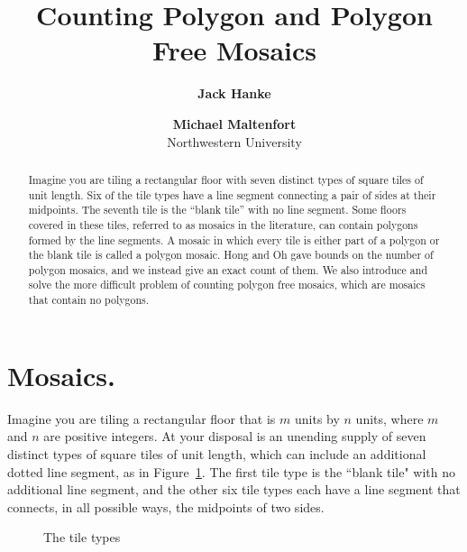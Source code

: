 \documentclass[12pt]{article}
\date{}
\author{
    \textbf{Jack Hanke}\\
    \and
    \textbf{Michael Maltenfort}\\
    Northwestern University
    }
\title{\textbf{Counting Polygon and Polygon Free Mosaics}}
\theoremstyle{plain}
\theoremstyle{remark}
\theoremstyle{definition}
\theoremstyle{remark}
\theoremstyle{definition}
\newcommand{\cell}[4]{ \draw[thick] ( #1 , #2 ) rectangle ( #3 , #4 );}
\newcommand{\cellA}[4]{ \draw[thick] ( #1 , #2 ) rectangle ( #3 , #4 ); \draw[red, thick, densely dotted] (#3 * 0.5 + #1 * 0.5 , #2) -- (#1, #4 * 0.5 + #2 * 0.5);}
\newcommand{\cellB}[4]{ \draw[thick] ( #1 , #2 ) rectangle ( #3 , #4 ); \draw[red, thick, densely dotted] (#3 * 0.5 + #1 * 0.5 , #2) -- (#3, #4 * 0.5 + #2 * 0.5);}
\newcommand{\cellC}[4]{ \draw[thick] ( #1 , #2 ) rectangle ( #3 , #4 ); \draw[red, thick, densely dotted] (#3 * 0.5 + #1 * 0.5 , #4) -- (#3, #4 * 0.5 + #2 * 0.5);}
\newcommand{\cellD}[4]{ \draw[thick] ( #1 , #2 ) rectangle ( #3 , #4 ); \draw[red, thick, densely dotted] (#3 * 0.5 + #1 * 0.5 , #4) -- (#1, #4 * 0.5 + #2 * 0.5);}
\newcommand{\cellE}[4]{ \draw[thick] ( #1 , #2 ) rectangle ( #3 , #4 ); \draw[red, thick, densely dotted] (#3, #4 * 0.5 + #2 * 0.5) -- (#1, #4 * 0.5 + #2 * 0.5);}
\newcommand{\cellF}[4]{ \draw[thick] ( #1 , #2 ) rectangle ( #3 , #4 ); \draw[red, thick, densely dotted] (#3 * 0.5 + #1 * 0.5 , #2) -- (#3 * 0.5 + #1 * 0.5 , #4);}
\newcommand{\lablnode}[3]{\node[shape=circle,draw=none,fill=none, inner sep=0pt,minimum size=0pt] (A) at ( #1 , #2 ) {#3};}
\begin{document}
\maketitle

\begin{center}

\begin{abstract}
Imagine you are tiling a rectangular floor with seven distinct types of square tiles of unit length. Six of the tile types have a line segment connecting a pair of sides at their midpoints. The seventh tile is the ``blank tile'' with no line segment. Some floors covered in these tiles, referred to as mosaics in the literature, can contain polygons formed by the line segments. A mosaic in which every tile is either part of a polygon or the blank tile is called a polygon mosaic.  Hong and Oh gave bounds on the number of polygon mosaics, and we instead give an exact count of them. We also introduce and solve the more difficult problem of counting polygon free mosaics, which are mosaics that contain no polygons.
\end{abstract}

\end{center}

\section{Mosaics.}

Imagine you are tiling a rectangular floor that is $m$ units by $n$ units, where $m$ and $n$ are positive integers. At your disposal is an unending supply of seven distinct types of square tiles of unit length, which can include an additional dotted line segment, as in Figure~\ref{fig:tile set}. The first tile type is the ``blank tile" with no additional line segment, and the other six tile types each have a line segment that connects, in all possible ways, the midpoints of two sides.

\begin{figure}[h!]
\begin{center}
\end{center}
\caption{The tile types}
\label{fig:tile set}
\end{figure}
\end{document}
